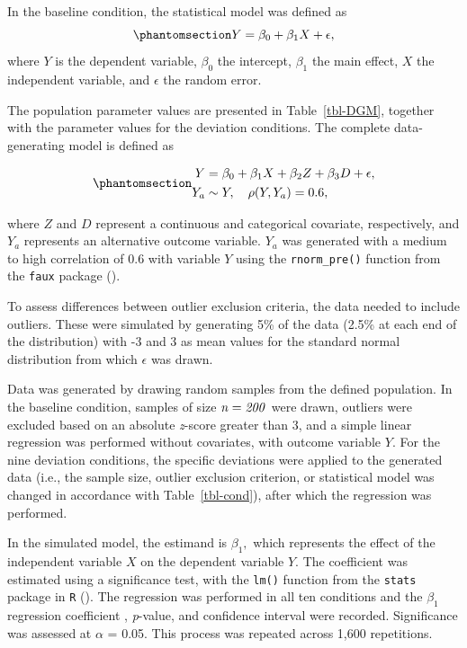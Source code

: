 \documentclass[
  man,
  floatsintext,
  longtable,
  nolmodern,
  notxfonts,
  notimes,
  colorlinks=true,linkcolor=blue,citecolor=blue,urlcolor=blue]{apa7}
\begin{document}
In the baseline condition, the statistical model was defined as
\begin{equation}\phantomsection\label{eq-regr}{
Y = \beta_0 + \beta_1X + \epsilon,
}\end{equation} where \(Y\) is the dependent variable, \(\beta_0\) the
intercept, \(\beta_1\) the main effect, \(X\) the independent variable,
and \(\epsilon\) the random error.

The population parameter values are presented in Table~\ref{tbl-DGM},
together with the parameter values for the deviation conditions. The
complete data-generating model is defined as

\begin{equation}\phantomsection\label{eq-fullreg}{
\begin{aligned}
Y &=  \beta_0 + \beta_1X + \beta_2Z + \beta_3D + \epsilon,\\
Y_a &\sim Y, \quad \rho(Y, Y_a) = 0.6, 
\end{aligned}
}\end{equation}

where \(Z\) and \(D\) represent a continuous and categorical covariate,
respectively, and \(Y_a\) represents an alternative outcome variable.
\(Y_a\) was generated with a medium to high correlation of 0.6 with
variable \(Y\) using the \texttt{rnorm\_pre()} function from the
\texttt{faux} package ().

To assess differences between outlier exclusion criteria, the data
needed to include outliers. These were simulated by generating 5\% of
the data (2.5\% at each end of the distribution) with -3 and 3 as mean
values for the standard normal distribution from which \(\epsilon\) was
drawn.

Data was generated by drawing random samples from the defined
population. In the baseline condition, samples of size \(\it{n} = 200\)
were drawn, outliers were excluded based on an absolute \emph{z}-score
greater than 3, and a simple linear regression was performed without
covariates, with outcome variable \(Y\). For the nine deviation
conditions, the specific deviations were applied to the generated data
(i.e., the sample size, outlier exclusion criterion, or statistical
model was changed in accordance with Table~\ref{tbl-cond}), after which
the regression was performed.

In the simulated model, the estimand is \(\beta_1,\) which represents
the effect of the independent variable \(X\) on the dependent variable
\(Y\). The coefficient was estimated using a significance test, with the
\texttt{lm()} function from the \texttt{stats} package in \texttt{R}
(). The regression was
performed in all ten conditions and the \(\beta_1\) regression
coefficient , \emph{p}-value, and confidence interval were recorded.
Significance was assessed at \(\alpha\) = 0.05. This process was
repeated across 1,600 repetitions.
\end{document}
